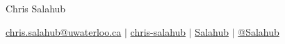 \documentclass[a4paper,11pt]{article}
\newcommand*{\img}[1]{%
	\raisebox{-0.05cm}{%
		\texttt{[image: \#1]}%
	}%
}
\newenvironment{compactDesc}
{ \begin{description}
		\setlength{\itemsep}{2pt}
		\setlength{\parskip}{2pt}
		\setlength{\parsep}{1pt}     }
	{ \end{description}                  }
\begin{document}
	\setlength{\tabcolsep}{0in}
	\setlength{\baselineskip}{2pt}
	\setlength{\lineskip}{4pt}
	\setlength{\parskip}{2pt}
	\setlength{\topskip}{2pt}

\begin{center}
	{\fontsize{35pt}{0pt} \selectfont Chris Salahub} \\
	\vspace{0.3cm}
	
	\href{mailto:chris.salahub@uwaterloo.ca}{\img{emailIcon} chris.salahub@uwaterloo.ca} \hspace{0.1cm} $\vert$ \hspace{0.1cm} 
	\href{https://www.linkedin.com/in/chris-salahub/}{\img{linkedinIcon} chris-salahub}  \hspace{0.1cm} $\vert$ \hspace{0.1cm}
	\href{https://github.com/Salahub}{\img{githubIcon} Salahub}  \hspace{0.1cm} $\vert$ \hspace{0.1cm}
	\href{https://medium.com/@Salahub}{\img{mediumIcon2} @Salahub} 

\end{center}


\vspace{0.15cm}


\end{document}

